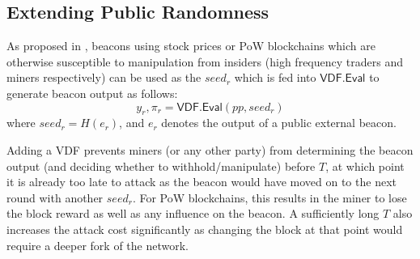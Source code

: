 \documentclass[letterpaper,twocolumn,10pt]{article}
\theoremstyle{definition}
\theoremstyle{remark}
\begin{document}
\subsection{Extending Public Randomness}
As proposed in \cite{bunz2017proofs, bonneau2015bitcoin}, beacons using stock prices \cite{clark2010use} or PoW blockchains \cite{bonneau2015bitcoin} which are otherwise susceptible to manipulation from insiders (high frequency traders and miners respectively) can be used as the $seed_r$ which is fed into $\mathsf{VDF.Eval}$ to generate beacon output as follows:
$$y_r, \pi_r = \mathsf{VDF.Eval}(pp, seed_r)$$
where $seed_r = H(e_r)$, and $e_r$ denotes the output of a public external beacon.

Adding a VDF prevents miners (or any other party) from determining the beacon output (and deciding whether to withhold/manipulate) before $T$, at which point it is already too late to attack as the beacon would have moved on to the next round with another $seed_r$. For PoW blockchains, this results in the miner to lose the block reward as well as any influence on the beacon. A sufficiently long $T$ also increases the attack cost significantly as changing the block at that point would require a deeper fork of the network. 
\end{document}
